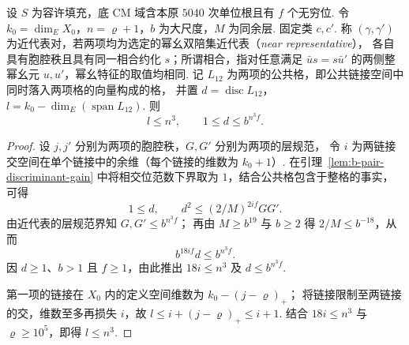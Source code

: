 \begin{lemma}[近代表对的判别式和余秩]
\label{lem:b-pair-corank}
\emitthmsource
设 $S$ 为容许填充，底 CM 域含本原 $5040$ 次单位根且有 $f$ 个无穷位.
令 $k_0=\dim_E X_0$，$n=\varrho+1$，$b$ 为大尺度，$M$ 为同余层.
固定类 $c,c'$. 称 $(\gamma,\gamma')$ 为近代表对，若两项均为选定的幂幺双陪集近代表（\emph{near representative}），
各自具有胞腔秩且具有同一相合约化 $s$；所谓相合，指对任意满足 $\bar u s=s\bar u'$
的两侧整幂幺元 $u,u'$，幂幺特征的取值均相同.
记 $L_{12}$ 为两项的公共格，即公共链接空间中同时落入两项格的向量构成的格，
并置 $d=\operatorname{disc}L_{12}$，$l=k_0-\dim_E(\operatorname{span}L_{12})$.
则
\[
  l\le n^3,\qquad 1\le d\le b^{n^3 f}.
\]
\end{lemma}
\begin{proof}
设 $j,j'$ 分别为两项的胞腔秩，$G,G'$ 分别为两项的层规范，
令 $i$ 为两链接交空间在单个链接中的余维（每个链接的维数为 $k_0+1$）.
在引理~\ref{lem:b-pair-discriminant-gain} 中将相交位范数下界取为 $1$，结合公共格包含于整格的事实，可得
\[
 1\le d,\qquad
 d^2\le (2/M)^{2if}GG'.
\]
由近代表的层规范界知 $G,G'\le b^{n^3 f}$；
再由 $M\ge b^{19}$ 与 $b\ge2$ 得 $2/M\le b^{-18}$，从而
\[
  b^{18if}d\le b^{n^3 f}.
\]
因 $d\ge1$、$b>1$ 且 $f\ge1$，由此推出 $18i\le n^3$ 及 $d\le b^{n^3 f}$.

第一项的链接在 $X_0$ 内的定义空间维数为 $k_0-(j-\varrho)_+$；
将链接限制至两链接的交，维数至多再损失 $i$，故
$l\le i+(j-\varrho)_+\le i+1$.
结合 $18i\le n^3$ 与 $\varrho\ge10^5$，即得 $l\le n^3$.
\end{proof}


